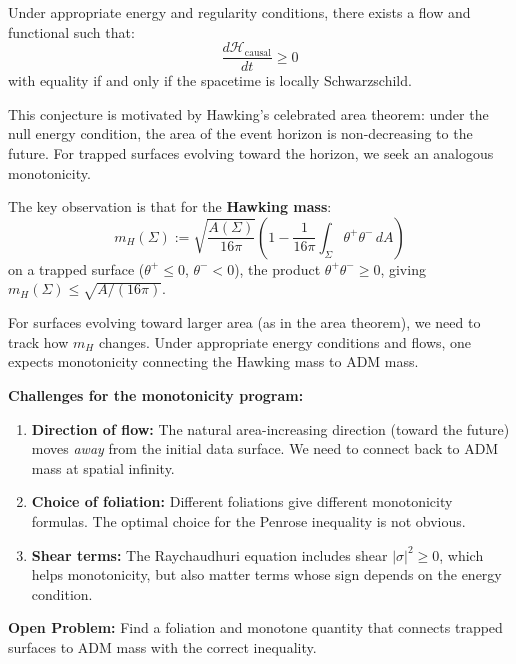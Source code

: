\begin{conjecture}\label{conj:CausalMonotonicity}
Under appropriate energy and regularity conditions, there exists a flow and functional such that:
\begin{equation}
    \frac{d\mathcal{H}_{\text{causal}}}{dt} \geq 0
\end{equation}
with equality if and only if the spacetime is locally Schwarzschild.
\end{conjecture}

\begin{remark}\label{rem:HawkingMotivation}
This conjecture is motivated by Hawking's celebrated area theorem: under the null energy condition, the area of the event horizon is non-decreasing to the future. For trapped surfaces evolving toward the horizon, we seek an analogous monotonicity.

The key observation is that for the \textbf{Hawking mass}:
\begin{equation}
    m_H(\Sigma) := \sqrt{\frac{A(\Sigma)}{16\pi}} \left(1 - \frac{1}{16\pi} \int_\Sigma \theta^+ \theta^- \, dA\right)
\end{equation}
on a trapped surface ($\theta^+ \leq 0$, $\theta^- < 0$), the product $\theta^+ \theta^- \geq 0$, giving $m_H(\Sigma) \leq \sqrt{A/(16\pi)}$.

For surfaces evolving toward larger area (as in the area theorem), we need to track how $m_H$ changes. Under appropriate energy conditions and flows, one expects monotonicity connecting the Hawking mass to ADM mass.
\end{remark}

\begin{remark}\label{rem:MonotonicityGap}
\textbf{Challenges for the monotonicity program:}
\begin{enumerate}
    \item \textbf{Direction of flow:} The natural area-increasing direction (toward the future) moves \emph{away} from the initial data surface. We need to connect back to ADM mass at spatial infinity.
    \item \textbf{Choice of foliation:} Different foliations give different monotonicity formulas. The optimal choice for the Penrose inequality is not obvious.
    \item \textbf{Shear terms:} The Raychaudhuri equation includes shear $|\sigma|^2 \geq 0$, which helps monotonicity, but also matter terms whose sign depends on the energy condition.
\end{enumerate}
\textbf{Open Problem:} Find a foliation and monotone quantity that connects trapped surfaces to ADM mass with the correct inequality.
\end{remark}

